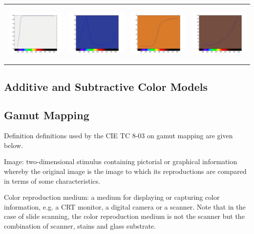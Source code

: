 \documentclass{amsart}
\theoremstyle{definition}
\theoremstyle{remark}
\numberwithin{equation}{section}
\begin{document}
\begin{tabular}{  c c c c }
\includegraphics[width=3.0cm,height=3.0cm]{images/ch21.jpg}
&
\includegraphics[width=3.0cm,height=3.0cm]{images/ch22.jpg}
&
\includegraphics[width=3.0cm,height=3.0cm]{images/ch23.jpg}
&
\includegraphics[width=3.0cm,height=3.0cm]{images/ch24.jpg}
\end{tabular}

\subsection{Additive and Subtractive Color Models}

\subsection{Gamut Mapping}
Definition definitions used by the CIE TC 8-03 on gamut mapping are given below.

Image: two-dimensional stimulus containing pictorial or graphical information whereby the original
image is the image to which its reproductions are compared in terms of some characteristics.

Color reproduction medium: a medium for displaying or capturing color information, e.g. a CRT
monitor, a digital camera or a scanner. Note that in the case of slide scanning, the color reproduction
medium is not the scanner but the combination of scanner, stains and glass substrate.
\end{document}
